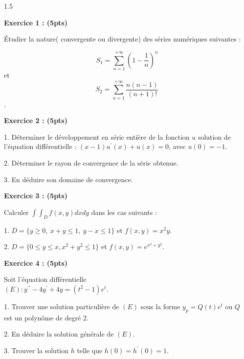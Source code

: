 \documentclass[12pt]{article}
\begin{document}
\begin{spacing}{1.5}

\textbf{Exercice 1 : (5pts)}

Étudier la nature( convergente ou divergente) des séries numériques suivantes : 

\[S_1=\sum^{+\infty}_{n=1}(1-\frac{1}{n})^n\] et \[S_2=\sum^{+\infty}_{n=1}\frac{n(n-1)}{(n+1)!}\].

\textbf{Exercice 2 : (5pts)}

1. Déterminer le développement en série entière de la fonction $u$ solution de l'équation différentielle : $(x-1)u^{\prime}(x) + u(x)=0$, avec $u(0)=-1$.

2. Déterminer le rayon de convergence de la série obtenue.

3. En déduire son domaine de convergence.

\textbf{Exercice 3 : (5pts)}

Calculer $\int\int_{D}f(x,y)dxdy$ dans les cas suivants :

1. $D= \lbrace y\geq 0,\ x+y\leq 1,\ y-x\leq 1\rbrace$ et $f(x,y)=x^{2}y$.

2. $D= \lbrace {0\leq y\leq x, x^2+y^2 \leq 1\rbrace}$ et $f(x,y)=e^{x^2+y^2}$.

\textbf{Exercice 4 : (5pts)}

Soit l'équation différentielle \\
$(E) : y^{\prime\prime}-4y^{\prime} + 4y = (t^2 - 1)e^t$.

1. Trouver une solution particulière de $(E)$ sous la forme $y_p= Q(t)e^t$ ou $Q$ est un polynôme de degré 2.

2. En déduire la solution générale de $(E)$.

3. Trouver la solution $h$ telle que $h(0)=h^{\prime}(0)=1$.

\end{spacing}
\end{document}
